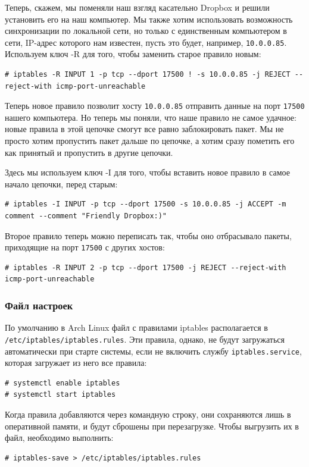 \documentclass[a4paper]{article}
\begin{document}
		Теперь, скажем, мы поменяли наш взгляд касательно Dropbox и решили установить его на наш компьютер. Мы также хотим использовать возможность синхронизации по локальной сети, но только с единственным компьютером в сети, IP-адрес которого нам известен, пусть это будет, например, \texttt{10.0.0.85}. Используем ключ -R для того, чтобы заменить старое правило новым:
		\begin{verbatim}
# iptables -R INPUT 1 -p tcp --dport 17500 ! -s 10.0.0.85 -j REJECT --reject-with icmp-port-unreachable
		\end{verbatim}
		
		Теперь новое правило позволит хосту \texttt{10.0.0.85} отправить данные на порт \texttt{17500} нашего компьютера. Но теперь мы поняли, что наше правило не самое удачное: новые правила в этой цепочке смогут все равно заблокировать пакет. Мы не просто хотим пропустить пакет дальше по цепочке, а хотим сразу пометить его как принятый и пропустить в другие цепочки.
		
		Здесь мы используем ключ -I для того, чтобы вставить новое правило в самое начало цепочки, перед старым:
		\begin{verbatim}
# iptables -I INPUT -p tcp --dport 17500 -s 10.0.0.85 -j ACCEPT -m comment --comment "Friendly Dropbox:)"
		\end{verbatim}
		
		Второе правило теперь можно переписать так, чтобы оно отбрасывало пакеты, приходящие на порт \texttt{17500} с других хостов:	
		\begin{verbatim}
# iptables -R INPUT 2 -p tcp --dport 17500 -j REJECT --reject-with icmp-port-unreachable
		\end{verbatim}
		
		\subsubsection{Файл настроек}
		
		По умолчанию в Arch Linux файл с правилами iptables располагается в \texttt{/etc/iptables/iptables.rules}. Эти правила, однако, не будут загружаться автоматически при старте системы, если не включить службу \texttt{iptables.service}, которая загружает из него все правила:
		\begin{verbatim}
# systemctl enable iptables
# systemctl start iptables
		\end{verbatim}
		Когда правила добавляются через командную строку, они сохраняются лишь в оперативной памяти, и будут сброшены при перезагрузке. Чтобы выгрузить их в файл, необходимо выполнить:	
		\begin{verbatim}
# iptables-save > /etc/iptables/iptables.rules
		\end{verbatim}
		
\end{document}
